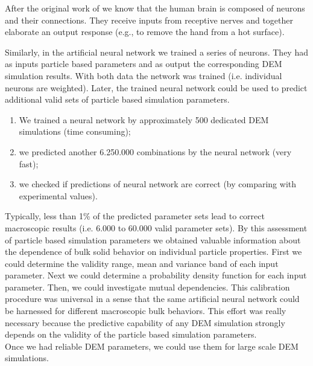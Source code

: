 After the original work of \citet{RefWorks:189} we know that the human brain is
composed of neurons and their connections. 
They receive inputs from receptive
nerves and together elaborate an output response (e.g., to remove the hand from
a hot surface).

Similarly, in the artificial neural network we trained a series of neurons.
They had
as inputs particle based parameters and as output the corresponding \acs{DEM}
simulation results.
With both data the network was trained (i.e. individual neurons are
weighted).
Later, the trained neural network could be used to predict additional valid sets
of particle based simulation parameters.

\begin{enumerate}
\item{We trained a neural network by approximately 500 dedicated DEM simulations
(time consuming);}
\item{we predicted another 6.250.000 combinations by the neural network (very
fast);}
\item{we checked if predictions of neural network are correct (by comparing with
experimental  values).}
\end{enumerate}

Typically, less than 1\% of the predicted parameter sets lead to correct
macroscopic results (i.e. 6.000 to 60.000 valid parameter sets).
By this assessment of particle based simulation parameters we obtained valuable
information about the dependence of bulk solid behavior on individual particle properties.
First we could determine the validity range, mean and variance band of each
input parameter. Next we could determine a probability density function for each
input parameter. Then, we could investigate mutual dependencies.
This calibration procedure was universal in a sense that the same artificial
neural network could be harnessed for different macroscopic bulk behaviors.
This effort was really necessary because the predictive capability of any
\acs{DEM} simulation strongly depends on the validity of the particle 
based simulation parameters.\\
Once we had reliable \acs{DEM} parameters, we could use them for large scale \acs{DEM}
simulations.
